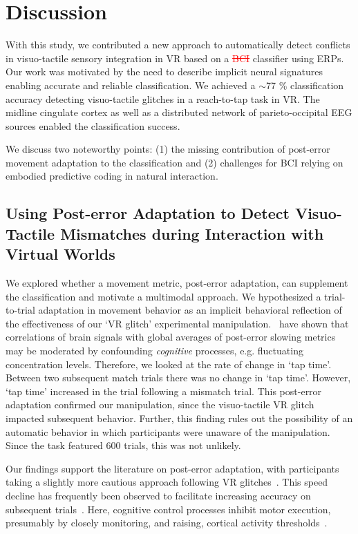\section{Discussion}

With this study, we contributed a new approach to automatically detect conflicts in visuo-tactile sensory integration in VR based on a \textcolor{red}{\st{BCI}} classifier using ERPs. Our work was motivated by the need to describe implicit neural signatures enabling accurate and reliable classification. We achieved a $\sim$77 \% classification accuracy detecting visuo-tactile glitches in a reach-to-tap task in VR. The midline cingulate cortex as well as a distributed network of parieto-occipital EEG sources enabled the classification success.

We discuss two noteworthy points: (1) the missing contribution of post-error movement adaptation to the classification and (2) challenges for BCI relying on embodied predictive coding in natural interaction.

\subsection{Using Post-error Adaptation to Detect Visuo-Tactile Mismatches during Interaction with Virtual Worlds}

We explored whether a movement metric, post-error adaptation, can supplement the classification and motivate a multimodal approach. We hypothesized a trial-to-trial adaptation in movement behavior as an implicit behavioral reflection of the effectiveness of our `VR glitch' experimental manipulation.~\cite{Dutilh2012-ps} have shown that correlations of brain signals with global averages of post-error slowing metrics may be moderated by confounding \textit{cognitive} processes, e.g. fluctuating concentration levels. Therefore, we looked at the rate of change in `tap time'. Between two subsequent match trials there was no change in `tap time'. However, `tap time' increased in the trial following a mismatch trial. This post-error adaptation confirmed our manipulation, since the visuo-tactile VR glitch impacted subsequent behavior. Further, this finding rules out the possibility of an automatic behavior in which participants were unaware of the manipulation. Since the task featured 600 trials, this was not unlikely. 

Our findings support the literature on post-error adaptation, with participants taking a slightly more cautious approach following VR glitches~\cite{Rabbitt1977-yg}. This speed decline has frequently been observed to facilitate increasing accuracy on subsequent trials~\cite{Ridderinkhof2004-rz}. Here, cognitive control processes inhibit motor execution, presumably by closely monitoring, and raising, cortical activity thresholds~\cite{Botvinick2001-bs}.

